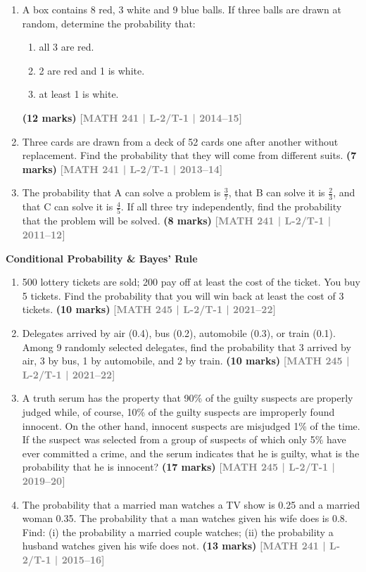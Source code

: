 \documentclass[12pt,a4paper]{article}
\newcommand{\yr}[1]{\hfill\textcolor{gray}{\small\textbf{[#1]}}}
\newcommand{\mk}[1]{\textcolor{orange!70!black}{\small\textbf{(#1 marks)}}}
\newcommand{\subtopic}[2]{%
  \vspace{10pt}
  \noindent\begin{tcolorbox}[colback=#1!8,colframe=#1,boxrule=0.6pt,arc=4pt,
    left=6pt,right=6pt,top=4pt,bottom=4pt]
    \small\bfseries\textcolor{#1}{#2}
  \end{tcolorbox}
  \vspace{2pt}
}
\begin{document}
\begin{enumerate}
\item A box contains 8 red, 3 white and 9 blue balls. If three balls are drawn at random, determine the probability that:
\begin{enumerate}
  \item all 3 are red.
  \item 2 are red and 1 is white.
  \item at least 1 is white.
\end{enumerate}
\mk{12} \yr{MATH 241 | L-2/T-1 | 2014--15}

\item Three cards are drawn from a deck of 52 cards one after another without replacement. Find the probability that they will come from different suits.
\mk{7} \yr{MATH 241 | L-2/T-1 | 2013--14}

\item The probability that A can solve a problem is $\tfrac{3}{7}$, that B can solve it is $\tfrac{2}{3}$, and that C can solve it is $\tfrac{4}{5}$. If all three try independently, find the probability that the problem will be solved.
\mk{8} \yr{MATH 241 | L-2/T-1 | 2011--12}

\end{enumerate}

\subtopic{cG}{Conditional Probability \& Bayes' Rule}
\label{sub:s8-cond}

\begin{enumerate}\item 500 lottery tickets are sold; 200 pay off at least the cost of the ticket. You buy 5 tickets. Find the probability that you will win back at least the cost of 3 tickets.
\mk{10} \yr{MATH 245 | L-2/T-1 | 2021--22}

\item Delegates arrived by air (0.4), bus (0.2), automobile (0.3), or train (0.1). Among 9 randomly selected delegates, find the probability that 3 arrived by air, 3 by bus, 1 by automobile, and 2 by train.
\mk{10} \yr{MATH 245 | L-2/T-1 | 2021--22}

\item A truth serum has the property that 90\% of the guilty suspects are properly judged while, of course, 10\% of the guilty suspects are improperly found innocent. On the other hand, innocent suspects are misjudged 1\% of the time. If the suspect was selected from a group of suspects of which only 5\%
 have ever committed a crime, and the serum indicates that he is guilty, what is the probability that he is innocent?
\mk{17} \yr{MATH 245 | L-2/T-1 | 2019--20}

\item The probability that a married man watches a TV show is 0.25 and a married woman 0.35. The probability that a man watches given his wife does is 0.8. Find: (i) the probability a married couple watches; (ii) the probability a husband watches given his wife does not.
\mk{13} \yr{MATH 241 | L-2/T-1 | 2015--16}

\end{enumerate}
\end{document}
